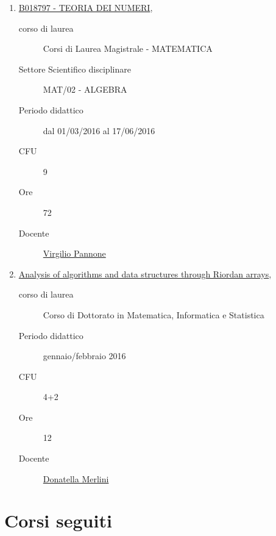 \documentclass[11pt]{article}
\begin{document}
\begin{enumerate}
\begin{description}
    \end{description}

\item \href{http://www.unifi.it/index.php?module=ofform2&mode=1&cmd=3&AA=2015&afId=426607}{B018797 - TEORIA DEI NUMERI},
    \begin{description}
        \item[corso di laurea] Corsi di Laurea Magistrale - MATEMATICA
        \item[Settore Scientifico disciplinare] MAT/02 - ALGEBRA
        \item[Periodo didattico] dal 01/03/2016 al 17/06/2016
        \item[CFU] 9 
        \item[Ore] 72
        \item[Docente] \href{http://www.unifi.it/index.php?module=ofform2&mode=1&cmd=3&AA=2015&afId=426607}{Virgilio Pannone}

    \end{description}

\item \href{}{Analysis of algorithms and data structures through Riordan arrays},
    \begin{description}
        \item[corso di laurea] Corso di Dottorato in Matematica, Informatica e Statistica
        \item[Periodo didattico] gennaio/febbraio 2016
        \item[CFU] 4+2
        \item[Ore] 12
        \item[Docente] \href{http://local.disia.unifi.it/merlini/}{Donatella Merlini}

    \end{description}
\end{enumerate}



\section*{Corsi seguiti}

\begin{description}

\item[%
] 

\item[%
] 

\end{description}
\end{document}
